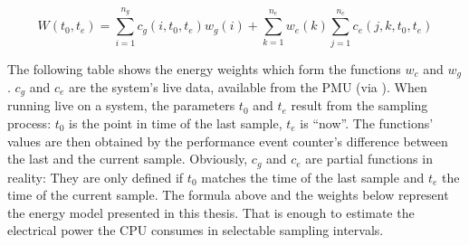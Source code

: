 \begin{equation}
W(t_0, t_e) = \sum\limits_{i=1}^{n_g} c_g(i, t_0, t_e) w_g(i) +
\sum\limits_{k=1}^{n_e} w_e(k) \sum\limits_{j=1}^{n_c}
c_e(j, k, t_0, t_e)
\end{equation}

The following table shows the energy weights which form the functions $w_c$ and
$w_g$. $c_g$ and $c_e$ are the system's live data, available from the PMU (via
\JWTlibpfm{}). When running live on a system, the parameters $t_0$ and $t_e$
result from the sampling process: $t_0$ is the point in time of the last sample,
$t_e$ is ``now''. The functions' values are then obtained by the performance
event counter's difference between the last and the current sample. Obviously,
$c_g$ and $c_e$ are partial functions in reality: They are only defined if $t_0$
matches the time of the last sample and $t_e$ the time of the current sample.
The formula above and the weights below represent the energy model presented in
this thesis. That is enough to estimate the electrical power the CPU consumes in
selectable sampling intervals.


